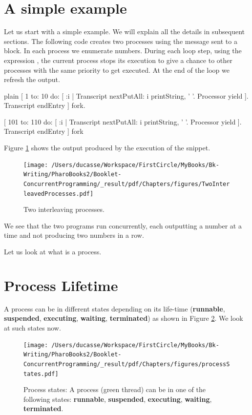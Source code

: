 \documentclass[10pt,twoside,english]{_support/latex/sbabook/sbabook}
\begin{document}
\section{A simple example}
Let us start with a simple example. 
We will explain all the details in subsequent sections. 
The following code creates two processes using the message  sent to a block. 
In each process we enumerate numbers. 
During each loop step, using the expression , the current process stops its execution to give a chance to other processes with the same priority to get executed. 
At the end of the loop we refresh the  output.

\begin{displaycode}{plain}
[ 1 to: 10 do: [ :i |
  Transcript nextPutAll: i printString, ' '.
  Processor yield ].
Transcript endEntry ] fork.

[ 101 to: 110 do: [ :i |
  Transcript nextPutAll: i  printString, ' '.
  Processor yield ].
Transcript endEntry ] fork
\end{displaycode}

Figure \ref{TwoInterleavingProcesses} shows the output produced by the execution of the snippet.


\begin{figure}

\begin{center}
\texttt{[image: /Users/ducasse/Workspace/FirstCircle/MyBooks/Bk-Writing/PharoBooks2/Booklet-ConcurrentProgramming/\_result/pdf/Chapters/figures/TwoInterleavedProcesses.pdf]}\caption{Two interleaving processes.\label{TwoInterleavingProcesses}}\end{center}
\end{figure}


We see that the two programs run concurrently, each outputting a number at a time and not producing two numbers in a row.

Let us look at what is a process.
\section{Process Lifetime}
A process can be in different states depending on its life-time (\textbf{runnable}, \textbf{suspended}, \textbf{executing}, \textbf{waiting}, \textbf{terminated}) as shown in Figure \ref{processStates}. We look at such states now.


\begin{figure}

\begin{center}
\texttt{[image: /Users/ducasse/Workspace/FirstCircle/MyBooks/Bk-Writing/PharoBooks2/Booklet-ConcurrentProgramming/\_result/pdf/Chapters/figures/processStates.pdf]}\caption{Process states:  A process (green thread) can be in one of the following states: \textbf{runnable}, \textbf{suspended}, \textbf{executing}, \textbf{waiting}, \textbf{terminated}.\label{processStates}}\end{center}
\end{figure}
\end{document}
